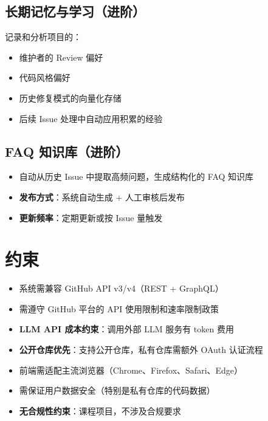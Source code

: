 \documentclass[10pt,a4paper]{article}
\begin{document}
\subsection{长期记忆与学习（进阶）}

记录和分析项目的：

\begin{itemize}
    \item 维护者的 Review 偏好
    \item 代码风格偏好
    \item 历史修复模式的向量化存储
    \item 后续 Issue 处理中自动应用积累的经验
\end{itemize}

\subsection{FAQ 知识库（进阶）}

\begin{itemize}
    \item 自动从历史 Issue 中提取高频问题，生成结构化的 FAQ 知识库
    \item \textbf{发布方式}：系统自动生成 + 人工审核后发布
    \item \textbf{更新频率}：定期更新或按 Issue 量触发
\end{itemize}

\section{约束}

\begin{itemize}
    \item 系统需兼容 GitHub API v3/v4（REST + GraphQL）
    \item 需遵守 GitHub 平台的 API 使用限制和速率限制政策
    \item \textbf{LLM API 成本约束}：调用外部 LLM 服务有 token 费用
    \item \textbf{公开仓库优先}：支持公开仓库，私有仓库需额外 OAuth 认证流程
    \item 前端需适配主流浏览器（Chrome、Firefox、Safari、Edge）
    \item 需保证用户数据安全（特别是私有仓库的代码数据）
    \item \textbf{无合规性约束}：课程项目，不涉及合规要求
\end{itemize}
\end{document}
